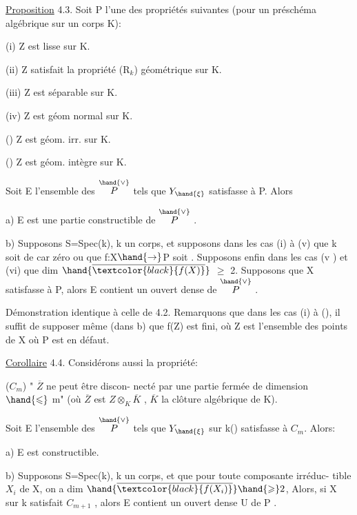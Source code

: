 
\uline{Proposition} 4.3.    Soit P l'une des propriétés  suivantes (pour un
préschéma algébrique sur un corps K):

(i)  Z  est lisse sur K.

(ii)  Z satisfait la propriété (R$_k$) géométrique sur K.

(iii)  Z est séparable sur K.

(iv)  Z est géom normal sur K.

\placedmargin{$\uparrow$}()  Z  est géom. irr.  sur K.

()  Z est géom. intègre  sur K.

Soit E l'ensemble des \hand{$\xi \in$} $\overset{\hand{\vee}}{P}$  tels que $Y_{\hand{\xi}}$ satisfasse à P. Alors

a)  E est une partie constructible de $\overset{\hand{\vee}}{P}$ .

b)  Supposons  S=Spec(k), k un corps, et supposons dans les cas (i) à (v) que k soit de
car zéro  ou que f:X$\hand{\rightarrow}$P  soit . Supposons enfin dans les
cas (v ) et (vi)  que dim $\hand{\overline{\textcolor{black}{f(X)}}}$ $\geqslant$ 2.  Supposons que X satisfasse à P,
alors E contient un ouvert  dense de $\overset{\hand{\vee}}{P}$ .

Démonstration identique à celle de 4.2.   Remarquons que dans
les cas (i) à (), il suffit de supposer même (dans b) que  f(Z) est
fini, où Z est l'ensemble des points de X où  P est en défaut.

\uline{Corollaire} 4.4.    Considérons aussi la propriété:

($C_m^{}$)   " $\overline{Z}$ ne peut être discon-%
necté par une partie fermée de dimension  $\hand{\leqslant}$ m" (où $\overline{Z}$ est $Z\otimes_K\overline{K}$ , $\overline{K}$
la clôture  algébrique de K).

Soit E l'ensemble des \hand{$\xi \in$} $\overset{\hand{\vee}}{P}$  tels que  $Y_{\hand{\xi}}$ sur k(\hand{$\xi$}) satisfasse à $C_m$.
Alors:

a)  E est constructible.

b)   Supposons S=Spec(k), k un corps, et que  pour toute composante irréduc-%
tible  $X_i$ de X, on a dim $\hand{\overline{\textcolor{black}{f(X_i)}}} \hand{\geqslant} 2$, Alors, si X sur k satisfait $C_{m+1}$ ,
alors E\hand{$_{\xi}$} contient un ouvert dense U de P .



